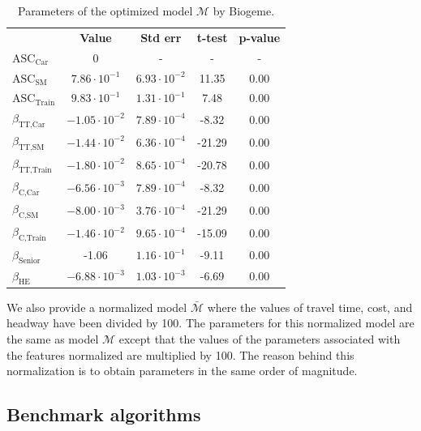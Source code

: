 \documentclass[conference]{IEEEtran}
\newcommand{\E}[1]{\cdot10^{#1}}
\begin{document}
\begin{table}
\centering
\renewcommand\arraystretch{1.2}
\begin{tabular}{l|cccc}
\multicolumn{1}{l}{} & {\bf Value} & {\bf Std err} & {\bf t-test} & {\bf p-value} \\ \cline{2-5}
$\text{ASC}_{\text{Car}}$ & 0 & - & - & - \\
$\text{ASC}_{\text{SM}}$ & $7.86\E{-1}$ & $6.93\E{-2}$ & 11.35 & 0.00 \\
$\text{ASC}_{\text{Train}}$ & $9.83\E{-1}$ & $1.31\E{-1}$ & 7.48 & 0.00 \\
$\beta_{\text{TT,Car}}$ & $-1.05\E{-2}$ & $7.89\E{-4}$ & -8.32 & 0.00 \\
$\beta_{\text{TT,SM}}$ & $-1.44\E{-2}$ & $6.36\E{-4}$ & -21.29 & 0.00 \\
$\beta_{\text{TT,Train}}$ & $-1.80\E{-2}$ & $8.65\E{-4}$ & -20.78 & 0.00 \\
$\beta_{\text{C,Car}}$ & $-6.56\E{-3}$ & $7.89\E{-4}$ & -8.32 & 0.00 \\
$\beta_{\text{C,SM}}$ & $-8.00\E{-3}$ & $3.76\E{-4}$ & -21.29 & 0.00 \\
$\beta_{\text{C,Train}}$ & $-1.46\E{-2}$ & $9.65\E{-4}$ & -15.09 & 0.00 \\
$\beta_{\text{Senior}}$ & -1.06 & $1.16\E{-1}$ & -9.11 & 0.00 \\
$\beta_{\text{HE}}$ & $-6.88\E{-3}$ & $1.03\E{-3}$ & -6.69 & 0.00
\end{tabular}
\caption{\label{tab:res_biogeme} Parameters of the optimized model $\mathcal{M}$ by Biogeme.}
\vspace{-0.8cm}
\end{table}

We also provide a normalized model $\bar{\mathcal{M}}$ where the values of travel time, cost, and headway have been divided by 100. The parameters for this normalized model are the same as model $\mathcal{M}$ except that the values of the parameters associated with the features normalized are multiplied by 100. The reason behind this normalization is to obtain parameters in the same order of magnitude. \\

\subsection{Benchmark algorithms}
\label{sec:algorithms}
\end{document}
